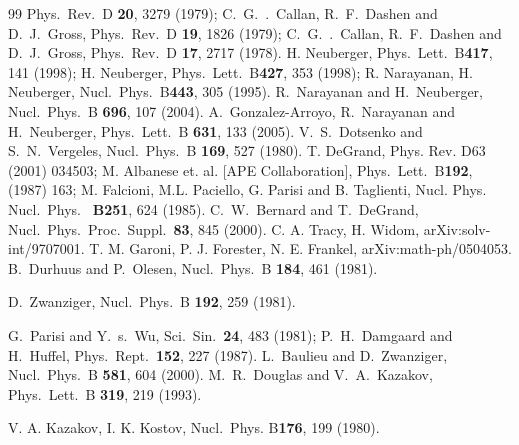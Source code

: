 \begin{thebibliography}{99}
  Phys.\ Rev.\ D {\bf 20}, 3279 (1979);
 C.~G.~.~Callan, R.~F.~Dashen and D.~J.~Gross,
  Phys.\ Rev.\ D {\bf 19}, 1826 (1979);
 C.~G.~.~Callan, R.~F.~Dashen and D.~J.~Gross,
  Phys.\ Rev.\ D {\bf 17}, 2717 (1978).
H. Neuberger, Phys.\ Lett.\ B{\bf 417}, 141 (1998);
H. Neuberger, Phys.\ Lett.\ B{\bf 427},  353 (1998);
R. Narayanan, H. Neuberger,
Nucl.\ Phys.\ B{\bf 443}, 305 (1995).
R.~Narayanan and H.~Neuberger,
  Nucl.\ Phys.\ B {\bf 696}, 107 (2004).
 A.~Gonzalez-Arroyo, R.~Narayanan and H.~Neuberger,
  Phys.\ Lett.\ B {\bf 631}, 133 (2005).
 V.~S.~Dotsenko and S.~N.~Vergeles,
  Nucl.\ Phys.\ B {\bf 169}, 527 (1980).
T. DeGrand, Phys. Rev. D63 (2001) 034503;
M. Albanese et. al. [APE Collaboration], Phys.\ Lett.\ B{\bf 192}, (1987) 163;
M. Falcioni, M.L. Paciello, G. Parisi and B. Taglienti, Nucl. Phys. Nucl.\ Phys.\ {\bf
B251}, 624 (1985).
C.~W.~Bernard and T.~DeGrand,
  Nucl.\ Phys.\ Proc.\ Suppl.\  {\bf 83}, 845 (2000).
 C. A. Tracy, H. Widom, arXiv:solv-int/9707001.
 T. M. Garoni, P. J. Forester, N. E. Frankel,
arXiv:math-ph/0504053.
B.~Durhuus and P.~Olesen,
  Nucl.\ Phys.\ B {\bf 184}, 461 (1981).

D.~Zwanziger,
  Nucl.\ Phys.\ B {\bf 192}, 259 (1981).

G.~Parisi and Y.~s.~Wu,
  Sci.\ Sin.\  {\bf 24}, 483 (1981);
P.~H.~Damgaard and H.~Huffel,
  Phys.\ Rept.\  {\bf 152}, 227 (1987).
L.~Baulieu and D.~Zwanziger,
  Nucl.\ Phys.\ B {\bf 581}, 604 (2000).
M.~R.~Douglas and V.~A.~Kazakov,
  Phys.\ Lett.\ B {\bf 319}, 219 (1993).

V. A. Kazakov, I. K. Kostov, Nucl.\ Phys. B{\bf 176}, 199 (1980).


\end{thebibliography}
